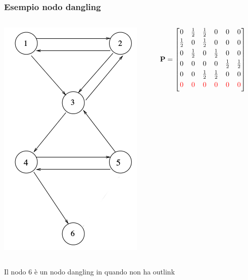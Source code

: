 \documentclass{beamer}
\begin{document}

\begin{frame}
	\frametitle{Esempio nodo dangling}
	\begin{columns}
		\begin{column}{0.4\textwidth}
			\includegraphics[width=.8\textwidth]{figure/graphDangling.png}
		\end{column}
		\begin{column}{0.6\textwidth}
			\vspace{1cm}
			$\textbf{P} = \begin{bmatrix}
			0           & \frac{1}{2} & \frac{1}{2}& 0          & 0          & 0           \\[0.3em]
			\frac{1}{2} & 0           & \frac{1}{2}& 0          & 0          & 0           \\[0.3em]
			0           & \frac{1}{2} & 0          & \frac{1}{2}& 0          & 0           \\[0.3em]
			0           & 0           & 0          & 0          & \frac{1}{2}& \frac{1}{2} \\[0.3em]
			0           & 0           & \frac{1}{2}& \frac{1}{2}& 0          & 0           \\[0.3em]
			\textcolor{red}{0}&\textcolor{red}{0}&\textcolor{red}{0}&\textcolor{red}{0}&\textcolor{red}{0}& \textcolor{red}{0}\\[0.3em]
			\end{bmatrix}$
		\end{column}
	\end{columns}
	Il nodo 6 è un nodo dangling in quando non ha outlink
\end{frame}
\end{document}
